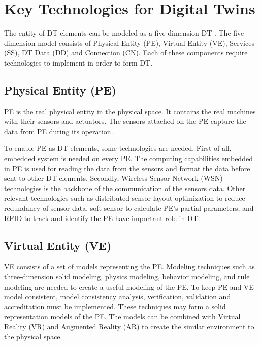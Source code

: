 \documentclass[article]{aaltoseries}
\begin{document}




\section{Key Technologies for Digital Twins}
The entity of DT elements can be modeled as a five-dimension DT \cite{Tao2019}. The five-dimension model consists of Physical Entity (PE), Virtual Entity (VE), Services (SS), DT Data (DD) and Connection (CN). Each of these components require technologies to implement in order to form DT.

\subsection{Physical Entity (PE)}
PE is the real physical entity in the physical space. It contains the real machines with their sensors and actuators. The sensors attached on the PE capture the data from PE during its operation.

To enable PE as DT elements, some technologies are needed. First of all, embedded system is needed on every PE. The computing capabilities embedded in PE is used for reading the data from the sensors and format the data before sent to other DT elements. Secondly, Wireless Sensor Network (WSN) technologies is the backbone of the communication of the sensors data. Other relevant technologies such as distributed sensor layout optimization to reduce redundancy of sensor data, soft sensor to calculate PE's partial parameters, and RFID to track and identify the PE have important role in DT.

\subsection{Virtual Entity (VE)}
VE consists of a set of models representing the PE. Modeling techniques such as three-dimension solid modeling, physics modeling, behavior modeling, and rule modeling are needed to create a useful modeling of the PE. To keep PE and VE model consistent, model consistency analysis, verification, validation and accreditation must be implemented. These techniques may form a solid representation models of the PE. The models can be combined with Virtual Reality (VR) and Augmented Reality (AR) to create the similar environment to the physical space.
\end{document}
